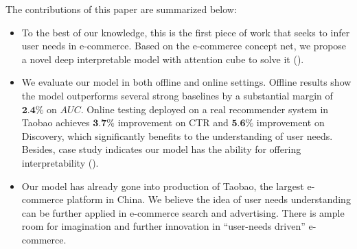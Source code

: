 The contributions of this paper are summarized below:
\begin{itemize}
	\itemsep0em
	\item To the best of our knowledge, this is the first piece of work that seeks
to infer user needs in e-commerce. Based on the e-commerce concept net,
	we propose a novel deep interpretable model with attention cube to solve it (). 
	
	
	\item We evaluate our model in both offline and online settings.
	Offline results show the model outperforms 
	several strong baselines by a substantial margin of $\textbf{2.4\%}$ on $AUC$.
	Online testing deployed on a real recommender system in Taobao achieves $\textbf{3.7\%}$ improvement on CTR and $\textbf{5.6\%}$ improvement on Discovery, which significantly benefits to the understanding of user needs. Besides, case study indicates our model has the ability for offering interpretability  ().
	\item Our model has already gone into production of Taobao, the largest e-commerce platform in China. We believe the idea of user needs understanding can be further applied in e-commerce search and advertising. 
There is ample room for imagination and further innovation in ``user-needs driven'' 
e-commerce.
\end{itemize}


